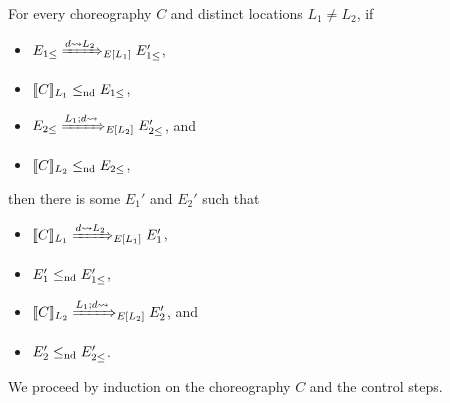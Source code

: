 \begin{lem}
\label{lem:choice-control-lowering}
For every choreography $C$ and distinct locations $L_1 \neq L_2$, if
\begin{itemize}
  \item $E_{1 \leq} \ctrlsteploc[d \sendsto L_2]{L_1} E_{1 \leq}'$,
  \item $\llbracket C\rrbracket_{L_1} \leq_{\text{nd}} E_{1 \leq}$,
  \item $E_{2 \leq} \ctrlsteploc[L_1;d \sendsto]{L_2} E_{2 \leq}'$, and
  \item $\llbracket C\rrbracket_{L_2} \leq_{\text{nd}} E_{2 \leq}$,
\end{itemize}
then there is some $E_1'$ and $E_2'$ such that
\begin{itemize}
  \item $\epp{C}{L_1} \ctrlsteploc[d \sendsto L_2]{L_1} E_1'$,
  \item $E_1' \leq_{\text{nd}} E_{1 \leq}'$,
  \item $\epp{C}{L_2} \ctrlsteploc[L_1;d \sendsto]{L_2} E_2'$, and
  \item $E_2' \leq_{\text{nd}} E_{2 \leq}'$.
\end{itemize}
\end{lem}
We proceed by induction on the choreography $C$ and the control steps.
